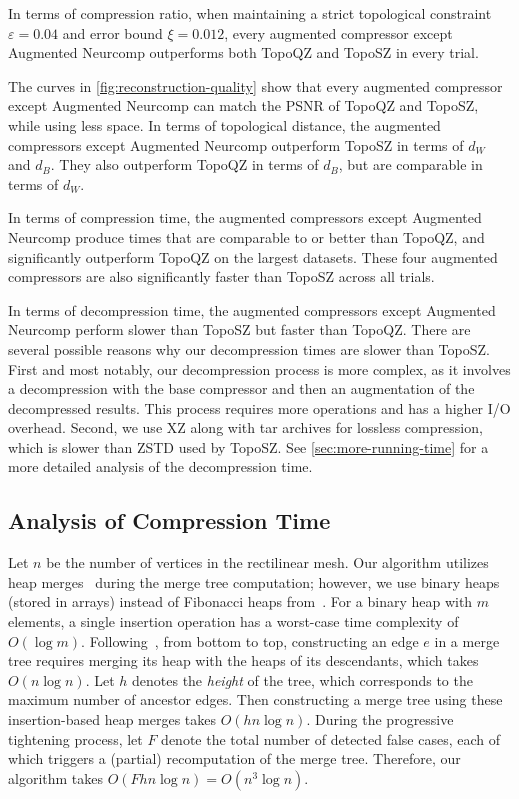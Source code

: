 In terms of compression ratio, when maintaining a strict topological constraint $\varepsilon = 0.04$ and error bound $\xi = 0.012$, every augmented compressor except Augmented Neurcomp outperforms both TopoQZ and TopoSZ in every trial.

The curves in \cref{fig:reconstruction-quality} show that every augmented compressor except Augmented Neurcomp can match the PSNR of TopoQZ and TopoSZ,  while using less space. In terms of topological distance, the augmented compressors except Augmented Neurcomp outperform TopoSZ in terms of $d_W$ and $d_B$. They also outperform TopoQZ in terms of $d_B$, but are comparable in terms of $d_W$.

In terms of compression time, the augmented compressors except Augmented Neurcomp produce times that are comparable to or better than TopoQZ, and significantly outperform TopoQZ on the largest datasets. 
These four augmented compressors are also significantly faster than TopoSZ across all trials. 

In terms of decompression time, the augmented compressors except Augmented Neurcomp perform slower than TopoSZ but faster than TopoQZ. There are several possible reasons why our decompression times are slower than TopoSZ. First and most notably, our decompression process is more complex, as it involves a decompression with the base compressor and then an augmentation of the decompressed results. This process requires more operations and has a higher I/O overhead. Second, we use XZ along with tar archives for lossless compression, which is slower than ZSTD used by TopoSZ. See \cref{sec:more-running-time} for a more detailed analysis of the decompression time.   

\subsection{Analysis of Compression Time}
\label{sec:run-time}

Let $n$ be the number of vertices in the rectilinear mesh. Our algorithm utilizes heap merges~\cite{gueunet2017task} during the merge tree computation; however, we use binary heaps (stored in arrays) instead of Fibonacci heaps from~\cite{gueunet2017task}. For a binary heap with $m$ elements, a single insertion operation has a worst-case time complexity of $O(\log m)$. 
Following~\cite{gueunet2017task}, from bottom to top, constructing an edge $e$ in a merge tree requires merging its heap with the heaps of its descendants, which takes $O(n \log n)$. Let $h$ denotes the \emph{height} of the tree, which corresponds to the maximum number of ancestor edges.
Then constructing a merge tree using these insertion-based heap merges takes $O(h n \log n)$. During the progressive tightening process, let $F$ denote the total number of detected false cases, each of which triggers a (partial) recomputation of the merge tree. Therefore, our algorithm takes $O(F h n \log n) = O(n^3 \log n)$. 

